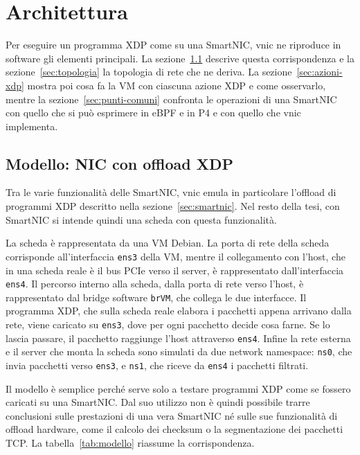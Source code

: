 \chapter{Architettura}\label{ch:architettura}

Per eseguire un programma XDP come su una SmartNIC, vnic ne riproduce in software gli elementi principali. La sezione~\ref{sec:modello} descrive questa corrispondenza e la sezione~\ref{sec:topologia} la topologia di rete che ne deriva. La sezione~\ref{sec:azioni-xdp} mostra poi cosa fa la VM con ciascuna azione XDP e come osservarlo, mentre la sezione~\ref{sec:punti-comuni} confronta le operazioni di una SmartNIC con quello che si può esprimere in eBPF e in P4 e con quello che vnic implementa.

\section{Modello: NIC con offload XDP}\label{sec:modello}

Tra le varie funzionalità delle SmartNIC, vnic emula in particolare l'offload di programmi XDP descritto nella sezione~\ref{sec:smartnic}. Nel resto della tesi, con SmartNIC si intende quindi una scheda con questa funzionalità.

La scheda è rappresentata da una VM Debian. La porta di rete della scheda corrisponde all'interfaccia \texttt{ens3} della VM, mentre il collegamento con l'host, che in una scheda reale è il bus PCIe verso il server, è rappresentato dall'interfaccia \texttt{ens4}. Il percorso interno alla scheda, dalla porta di rete verso l'host, è rappresentato dal bridge software \texttt{brVM}, che collega le due interfacce. Il programma XDP, che sulla scheda reale elabora i pacchetti appena arrivano dalla rete, viene caricato su \texttt{ens3}, dove per ogni pacchetto decide cosa farne. Se lo lascia passare, il pacchetto raggiunge l'host attraverso \texttt{ens4}. Infine la rete esterna e il server che monta la scheda sono simulati da due network namespace: \texttt{ns0}, che invia pacchetti verso \texttt{ens3}, e \texttt{ns1}, che riceve da \texttt{ens4} i pacchetti filtrati.

Il modello è semplice perché serve solo a testare programmi XDP come se fossero caricati su una SmartNIC. Dal suo utilizzo non è quindi possibile trarre conclusioni sulle prestazioni di una vera SmartNIC né sulle sue funzionalità di offload hardware, come il calcolo dei checksum o la segmentazione dei pacchetti TCP. La tabella~\ref{tab:modello} riassume la corrispondenza.

